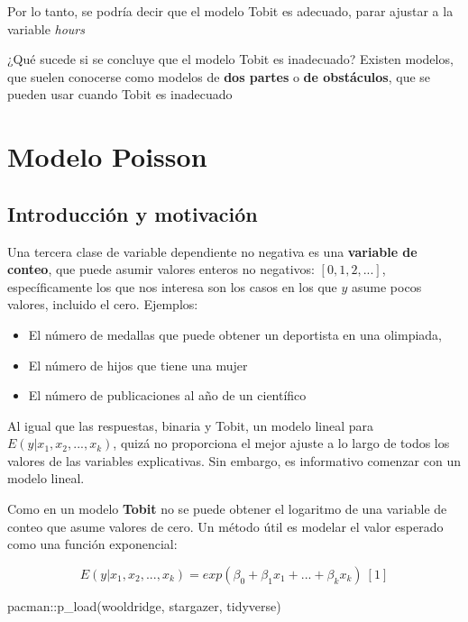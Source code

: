 \documentclass[
  letterpaper,
  DIV=11,
  numbers=noendperiod]{scrreprt}
\newenvironment{Shaded}{\begin{snugshade}}{\end{snugshade}}
\newcommand{\FunctionTok}[1]{\textcolor[rgb]{0.28,0.35,0.67}{#1}}
\newcommand{\NormalTok}[1]{\textcolor[rgb]{0.00,0.23,0.31}{#1}}
\newcommand{\SpecialCharTok}[1]{\textcolor[rgb]{0.37,0.37,0.37}{#1}}
\begin{document}
Por lo tanto, se podría decir que el modelo Tobit es adecuado, parar
ajustar a la variable \emph{hours}

¿Qué sucede si se concluye que el modelo Tobit es inadecuado? Existen
modelos, que suelen conocerse como modelos de \textbf{dos partes} o
\textbf{de obstáculos}, que se pueden usar cuando Tobit es inadecuado


\chapter{Modelo Poisson}\label{modelo-poisson}

\section{Introducción y
motivación}\label{introducciuxf3n-y-motivaciuxf3n}

Una tercera clase de variable dependiente no negativa es una
\textbf{variable de conteo}, que puede asumir valores enteros no
negativos: \([0,1,2,...]\), específicamente los que nos interesa son los
casos en los que \(y\) asume pocos valores, incluido el cero. Ejemplos:

\begin{itemize}
\item
  El número de medallas que puede obtener un deportista en una
  olimpiada,
\item
  El número de hijos que tiene una mujer
\item
  El número de publicaciones al año de un científico
\end{itemize}

Al igual que las respuestas, binaria y Tobit, un modelo lineal para
\(E(y|x_1,x_2,...,x_k)\), quizá no proporciona el mejor ajuste a lo
largo de todos los valores de las variables explicativas. Sin embargo,
es informativo comenzar con un modelo lineal.

Como en un modelo \textbf{Tobit} no se puede obtener el logaritmo de una
variable de conteo que asume valores de cero. Un método útil es modelar
el valor esperado como una función exponencial:

\[E(y|x_1,x_2,...,x_k)=exp(\beta_0+\beta_1x_1+...+\beta_kx_k)\ [1]\]

\begin{Shaded}
\begin{Highlighting}[]
\NormalTok{pacman}\SpecialCharTok{::}\FunctionTok{p\_load}\NormalTok{(wooldridge, }
\NormalTok{               stargazer, }
\NormalTok{               tidyverse)}
\end{Highlighting}
\end{Shaded}
\end{document}
